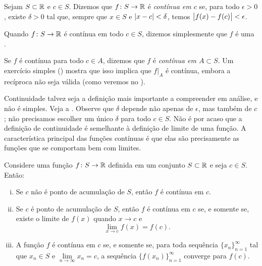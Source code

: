 \begin{defn}
Sejam $S \subset {\mathbb{R}}$ e $c \in S$.
Dizemos que $f \colon S \to {\mathbb{R}}$
é \emph{contínua em $c$}
se, para todo $\epsilon > 0$,
existe $\delta > 0$ tal que, sempre que $x \in S$ e $\sabs{x-c} <
\delta$, temos
$\bigl\lvert {f(x)-f(c)} \bigr\rvert < \epsilon$.


Quando $f \colon S \to {\mathbb{R}}$ é contínua em todo $c \in S$, dizemos simplesmente
que $f$ é uma \emph{}.
\end{defn}
\begin{myfigureht}
\caption{Quando $\sabs{x-c} < \delta$, o gráfico de $f(x)$ deve estar dentro da região cinza.\label{fig:contigr}}
\end{myfigureht}

Se $f$ é contínua para todo $c \in A$, dizemos que
$f$ é \emph{contínua em $A \subset S$}. Um exercício simples
() mostra que isso implica que
$f|_A$ é contínua, embora a recíproca não seja válida (como veremos no
).

Continuidade talvez seja a definição mais importante a compreender em análise,
e não é simples. Veja a .
Observe que $\delta$ depende não apenas
de $\epsilon$, mas também de $c$; não precisamos escolher
um único $\delta$ para todo $c \in S$.
Não é por acaso
que a definição de continuidade é semelhante à definição de limite de uma
função. A característica principal das funções contínuas
é que elas são precisamente as funções que se comportam bem com limites.

\begin{prop} \label{contbasic:prop}
Considere uma função $f \colon S \to {\mathbb{R}}$ definida em um conjunto $S \subset {\mathbb{R}}$
e seja $c \in S$.
Então:
\begin{enumerate}[(i)]
\item \label{contbasic:prop:i}
Se $c$ não é ponto de acumulação de $S$, então $f$ é contínua em $c$.
\item \label{contbasic:prop:ii}
Se $c$ é ponto de acumulação de $S$, então $f$ é contínua em $c$
se, e somente se, existe o limite de $f(x)$ quando $x \to c$ e
\begin{equation*}
\lim_{x\to c} f(x) = f(c) .
\end{equation*}
\item \label{contbasic:prop:iii}
A função $f$ é contínua em $c$ se, e somente se, para toda sequência
$\{ x_n \}_{n=1}^\infty$
tal que $x_n \in S$ e $\lim\limits_{n\to\infty} x_n = c$, a sequência
$\bigl\{ f(x_n) \bigr\}_{n=1}^\infty$ converge
para $f(c)$.
\end{enumerate}
\end{prop}


